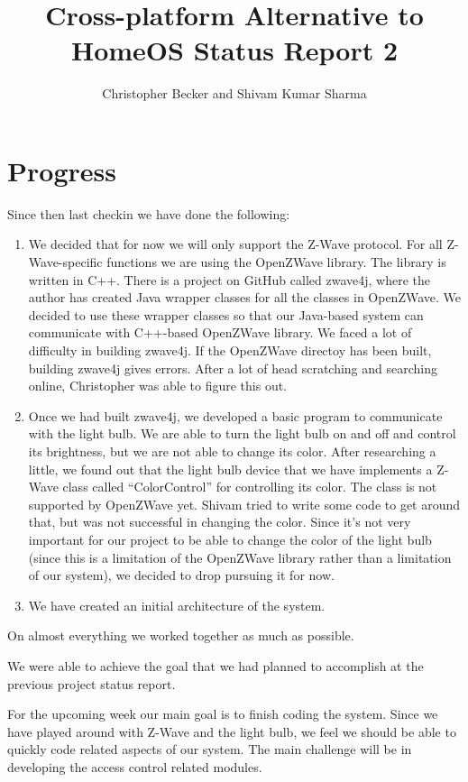 \documentclass[letterpaper,12pt]{article}
\title{Cross-platform Alternative to HomeOS Status Report 2}
\author{Christopher Becker and Shivam Kumar Sharma}
\begin{document}
\maketitle

\section*{Progress}
Since then last checkin we have done the following:
\begin{enumerate}
 \item We decided that for now we will only support the Z-Wave protocol. For all Z-Wave-specific functions we are using the OpenZWave library. The library is written in C++. There is a project on GitHub called zwave4j, where the author has created Java wrapper classes for all the classes in OpenZWave. We decided to use these wrapper classes so that our Java-based system can communicate with C++-based OpenZWave library. We faced a lot of difficulty in building zwave4j. If the OpenZWave directoy has been built, building zwave4j gives errors. After a lot of head scratching and searching online, Christopher was able to figure this out.
 \item Once we had built zwave4j, we developed a basic program to communicate with the light bulb. We are able to turn the light bulb on and off and control its brightness, but we are not able to change its color. After researching a little, we found out that the light bulb device that we have implements a Z-Wave class called ``ColorControl'' for controlling its color. The class is not supported by OpenZWave yet. Shivam tried to write some code to get around that, but was not successful in changing the color. Since it's not very important for our project to be able to change the color of the light bulb (since this is a limitation of the OpenZWave library rather than a limitation of our system), we decided to drop pursuing it for now.
 \item We have created an initial architecture of the system.
\end{enumerate}
On almost everything we worked together as much as possible.

We were able to achieve the goal that we had planned to accomplish at the previous project status report.

For the upcoming week our main goal is to finish coding the system. Since we have played around with Z-Wave and the light bulb, we feel we should be able to quickly code related aspects of our system. The main challenge will be in developing the access control related modules.
\end{document}
